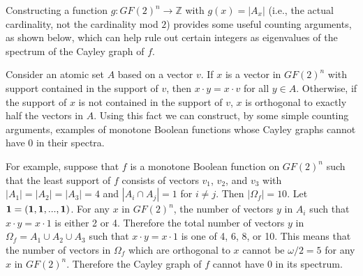 \documentclass[12pt]{article}
\def\zzz{\mathbb{Z}}
\begin{document}
Constructing a function $g: GF(2)^n \rightarrow \zzz$ with $g(x) =
|A_x|$ (i.e., the actual
cardinality, not the cardinality mod $2$) provides some useful
counting arguments, as shown below,
which can help rule out certain integers as eigenvalues of the spectrum of the Cayley graph of $f$.

Consider an atomic set $A$ based on a vector $v$.  If $x$ is a vector
in $GF(2)^n$ with support
contained in the support of $v$, then
$x \cdot y = x \cdot v$ for all $y \in A$.  Otherwise, if the support
of $x$ is not contained in the
support of $v$, $x$ is orthogonal to exactly half the vectors in $A$.
Using this fact we can
construct, by some simple counting arguments, examples of monotone Boolean functions whose
Cayley graphs cannot have 0 in their spectra.

For example, suppose that $f$ is a monotone Boolean function on $GF(2)^n$ such that
the least support of $f$ consists of vectors $v_1$, $v_2$, and $v_3$
with $|A_1|=|A_2|=|A_3|=4$
and $|A_i \cap A_j|=1$ for $i \neq j$.  Then $|\Omega_f|=10$.  Let
$\bf{1}=(1,1,...,1)$.
For any $x$ in $GF(2)^n$, the number of vectors $y$ in $A_i$  such
that $x \cdot y=x \cdot 1$ is
either 2 or 4.  Therefore the total number of vectors $y$ in $\Omega_f
= A_1 \cup A_2 \cup A_3$
such that $x \cdot y = x \cdot 1$ is one of 4, 6, 8, or 10.  This
means that the number of
vectors in $\Omega_f$ which are orthogonal to $x$ cannot be
$\omega/2=5$ for any $x$ in
$GF(2)^n$.  Therefore the Cayley graph of $f$ cannot have $0$ in its
spectrum.
\end{document}
